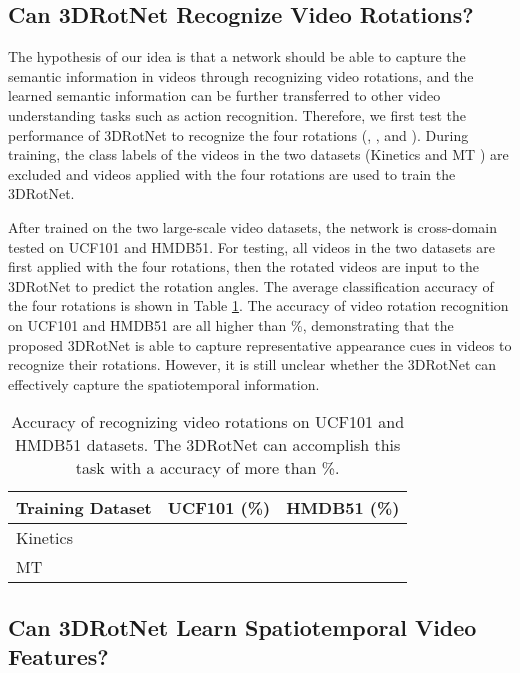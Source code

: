 \documentclass[10pt,twocolumn,letterpaper]{article}
\begin{document}
\subsection{Can 3DRotNet Recognize Video Rotations?}

The hypothesis of our idea is that a network should be able to capture the semantic information in videos through recognizing video rotations, and the learned semantic information can be further transferred to other video understanding tasks such as action recognition. Therefore, we first test the performance of 3DRotNet to recognize the four rotations (, ,  and ). During training, the class labels of the videos in the two datasets (Kinetics \cite{Kinetics} and MT \cite{MITS}) are excluded and videos applied with the four rotations are used to train the 3DRotNet.

After trained on the two large-scale video datasets, the network is cross-domain tested on UCF101 and HMDB51. For testing, all videos in the two datasets are first applied with the four rotations, then the rotated videos are input to the 3DRotNet to predict the rotation angles. The average classification accuracy of the four rotations is shown in Table \ref{tab:rotation_acc}. The accuracy of video rotation recognition on UCF101 and HMDB51 are all higher than \%, demonstrating that the proposed 3DRotNet is able to capture representative appearance cues in videos to recognize their rotations. However, it is still unclear whether the 3DRotNet can effectively capture the spatiotemporal information. 

\begin{table}[ht]
\begin{center}
\begin{tabular}{l|c|c}
\hline
Training Dataset   & UCF101 (\%)     & HMDB51 (\%)\\
\hline\hline
Kinetics           &      & \\
MT                 &      & \\
\hline
\end{tabular}
\end{center}
\caption{Accuracy of recognizing video rotations on  UCF101 and HMDB51 datasets. The 3DRotNet can accomplish this task with a accuracy of more than \%.}
\label{tab:rotation_acc}
\end{table}


\subsection{Can 3DRotNet Learn Spatiotemporal Video Features?}
\end{document}
